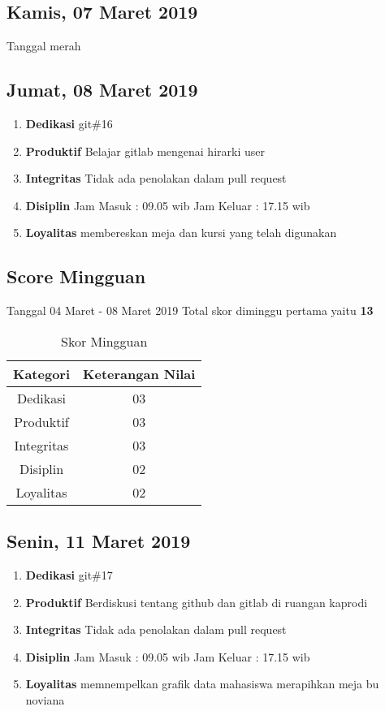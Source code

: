 \subsection{Kamis, 07 Maret 2019}
Tanggal merah

\subsection{Jumat, 08 Maret 2019}
\begin{enumerate}
\item \textbf{Dedikasi}
\subitem git\#16
\item \textbf{Produktif}
\subitem Belajar gitlab mengenai hirarki user 
\item \textbf{Integritas}
\subitem Tidak ada penolakan dalam pull request
\item \textbf{Disiplin}
\subitem Jam Masuk : 09.05 wib
\subitem Jam Keluar : 17.15 wib
\item \textbf{Loyalitas}
\subitem membereskan meja dan kursi yang telah digunakan
\end{enumerate}

\subsection{Score Mingguan} 
Tanggal 04 Maret - 08 Maret 2019 Total skor diminggu pertama yaitu \textbf{13}

\begin{table}[h]
\caption{Skor Mingguan}
\centering
\begin{tabular}{|c|c|}
\hline
\textbf{Kategori}&\textbf{Keterangan Nilai}\\
\hline
Dedikasi&03\\
\hline
Produktif&03\\
\hline
Integritas&03\\
\hline
Disiplin&02\\
\hline
Loyalitas&02\\
\hline
\end{tabular}
\label{table : skor minggu kedua}
\end{table}

\subsection{Senin, 11 Maret 2019}
\begin{enumerate}
\item \textbf{Dedikasi}
\subitem git\#17
\item \textbf{Produktif}
\subitem Berdiskusi tentang github dan gitlab di ruangan kaprodi 
\item \textbf{Integritas}
\subitem Tidak ada penolakan dalam pull request
\item \textbf{Disiplin}
\subitem Jam Masuk : 09.05 wib
\subitem Jam Keluar : 17.15 wib
\item \textbf{Loyalitas}
\subitem memnempelkan grafik data mahasiswa
\subitem merapihkan meja bu noviana
\end{enumerate}

